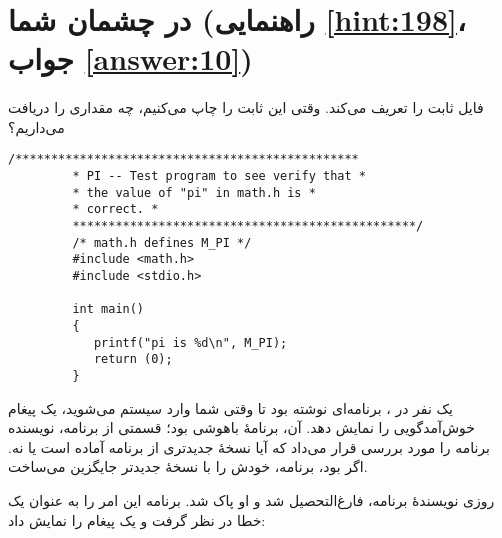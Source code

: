 \section[\lr{π} در چشمان شما]{ در چشمان شما \protect{} (راهنمایی \ref{hint:198}، جواب \ref{answer:10})}
\paragraph{}\label{prog:64}
فایل  ثابت  را تعریف می‌کند. وقتی این ثابت را چاپ می‌کنیم، چه مقداری را دریافت می‌داریم؟

\begin{LTR}
    \begin{lstlisting}[style=C++Style]
         /************************************************
         * PI -- Test program to see verify that *
         * the value of "pi" in math.h is *
         * correct. *
         ************************************************/
         /* math.h defines M_PI */
         #include <math.h>
         #include <stdio.h>

         int main()
         {
         	printf("pi is %d\n", M_PI);
         	return (0);
         }
    \end{lstlisting}
\end{LTR}

\begin{tcolorbox}
    یک نفر در ، برنامه‌ای نوشته بود تا وقتی شما وارد سیستم می‌شوید، یک پیغام خوش‌آمدگویی را نمایش دهد. آن، برنامهٔ باهوشی بود؛ قسمتی از برنامه،  نویسنده برنامه را مورد بررسی قرار می‌داد که آیا نسخهٔ جدیدتری از برنامه آماده است یا نه. اگر بود، برنامه، خودش را با نسخهٔ جدیدتر جایگزین می‌ساخت.

    روزی نویسندهٔ برنامه، فارغ‌التحصیل شد و  او پاک شد. برنامه این امر را به عنوان یک خطا در نظر گرفت و یک پیغام را نمایش داد:
    \LTR\noindent
\end{tcolorbox}